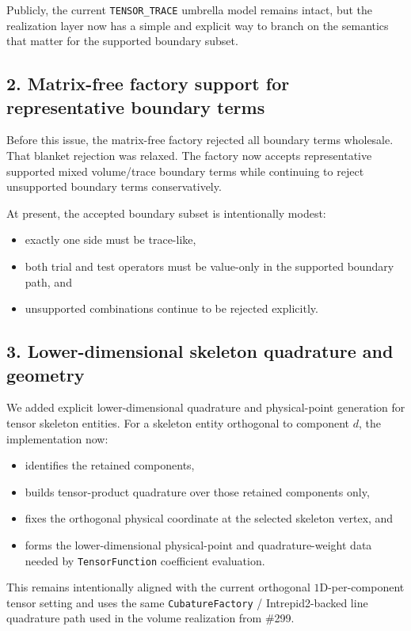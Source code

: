 \documentclass[11pt]{article}
\begin{document}
Publicly, the current \texttt{TENSOR\_TRACE} umbrella model remains intact, but the realization layer now has a simple and explicit way to branch on the semantics that matter for the supported boundary subset.

\subsection{2. Matrix-free factory support for representative boundary terms}

Before this issue, the matrix-free factory rejected all boundary terms wholesale. That blanket rejection was relaxed. The factory now accepts representative supported mixed volume/trace boundary terms while continuing to reject unsupported boundary terms conservatively.

At present, the accepted boundary subset is intentionally modest:
\begin{itemize}[leftmargin=*]
  \item exactly one side must be trace-like,
  \item both trial and test operators must be value-only in the supported boundary path, and
  \item unsupported combinations continue to be rejected explicitly.
\end{itemize}

\subsection{3. Lower-dimensional skeleton quadrature and geometry}

We added explicit lower-dimensional quadrature and physical-point generation for tensor skeleton entities. For a skeleton entity orthogonal to component \(d\), the implementation now:
\begin{itemize}[leftmargin=*]
  \item identifies the retained components,
  \item builds tensor-product quadrature over those retained components only,
  \item fixes the orthogonal physical coordinate at the selected skeleton vertex, and
  \item forms the lower-dimensional physical-point and quadrature-weight data needed by \texttt{TensorFunction} coefficient evaluation.
\end{itemize}

This remains intentionally aligned with the current orthogonal \(1\)D-per-component tensor setting and uses the same \texttt{CubatureFactory} / Intrepid2-backed line quadrature path used in the volume realization from \#299.
\end{document}
